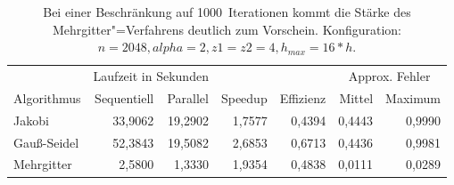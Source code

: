 \documentclass[paper = a4]{scrartcl}
\begin{document}
\begin{table}[ht]
    \centering
    \begin{tabular}{|l|r|r|r|r|r|r|} \hline
    & \multicolumn{2}{c|}{Laufzeit in Sekunden} & & & \multicolumn{2}{c|}{Approx. Fehler} \\
    Algorithmus & Sequentiell & Parallel & Speedup & Effizienz & Mittel   & Maximum \\ \hline \hline
    Jakobi      & 33,9062     & 19,2902  & 1,7577  & 0,4394    & 0,4443   & 0,9990  \\
    Gauß-Seidel & 52,3843     & 19,5082  & 2,6853  & 0,6713    & 0,4436   & 0,9981  \\
    Mehrgitter  & 2,5800      & 1,3330   & 1,9354  & 0,4838    & 0,0111   & 0,0289  \\ \hline
    \end{tabular}
    \caption{Bei einer Beschränkung auf 1000~Iterationen kommt die Stärke des Mehrgitter"=Verfahrens deutlich zum Vorschein. Konfiguration: \(n=2048, alpha=2, z1=z2=4, h_{max}=16*h\).}
    \label{tab:f}
\end{table}
\end{document}
